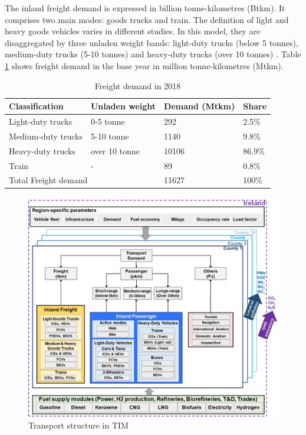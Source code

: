 \documentclass[gmd,manuscript]{copernicus}
\begin{document}
The inland freight demand is expressed in billion tonne-kilometres (Btkm). It comprises two main modes: goods trucks and train. The definition of light and heavy goods vehicles varies in different studies. In this model, they are disaggregated by three unladen weight bands: light-duty trucks (below 5 tonnes), medium-duty trucks (5-10 tonnes) and heavy-duty trucks (over 10 tonnes) \citep{CentralStatisticsOffice2020d,CentralStatisticsOffice2020e,CentralStatisticsOffice2020f}. Table \ref{ton-km} shows freight demand in the base year in million tonne-kilometres (Mtkm). 

\begin{table}[ht]
 \centering
 \footnotesize
 \caption{Freight demand in 2018 \citep{ CentralStatisticsOffice2020d, CentralStatisticsOffice2020e, CentralStatisticsOffice2020f}}
 \begin{tabular}{llll}
 \hline 
 Classification & Unladen weight & Demand (Mtkm) & Share\\ 
 \hline
 Light-duty trucks & 0-5 tonne & 292 & 2.5\% \\
 Medium-duty trucks & 5-10 tonne & 1140 & 9.8\% \\
 Heavy-duty trucks & over 10 tonne &	10106 & 86.9\% \\
 Train & - &	89 & 0.8\% \\
 
 \multicolumn{2}{l}{Total Freight demand} & 11627 & 100\% \\ \hline
 \end{tabular}
 
 \label{ton-km}
\end{table}

\begin{figure}[ht]
 \centering
 \includegraphics[scale=0.60]{figures/Transport in TIM.jpg} 
 \caption{Transport structure in TIM}
 \label{fig:TRA-TIM}
\end{figure}
\end{document}
